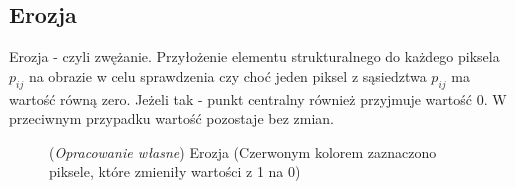 \documentclass{article}
\begin{document}
        \subsection{Erozja}
        {
            \Large
            \justifying
            \quad
            Erozja - czyli zwężanie.
            Przyłożenie elementu strukturalnego do każdego piksela \(p_{ij}\) na obrazie w celu sprawdzenia czy choć jeden piksel z sąsiedztwa \(p_{ij}\) ma wartość równą zero.
            Jeżeli tak - punkt centralny również przyjmuje wartość 0. W przeciwnym przypadku wartość pozostaje bez zmian.
        }
        \begin{figure}[H]
            \centering
            \qquad
            \qquad
            \caption
            {
                (\textit{Opracowanie własne}) Erozja (Czerwonym kolorem zaznaczono piksele, które zmieniły wartości z 1 na 0)
            }
        \end{figure}
\end{document}
